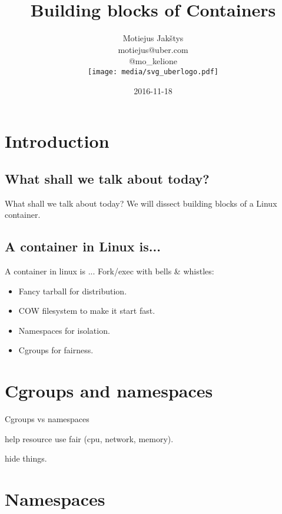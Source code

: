 \documentclass[14pt]{beamer}
\title{Building blocks of Containers}
\author{Motiejus Jak\v{s}tys \\
    motiejus@uber.com \\
    @mo\_kelione \\
    \vspace{1em}
    \texttt{[image: media/svg\_uberlogo.pdf]}
}
\date{2016-11-18}
\begin{document}

\begin{frame}
\titlepage
\end{frame}

\section{Introduction}
\subsection{What shall we talk about today?}
\begin{frame}{What shall we talk about today?}
    We will dissect building blocks of a Linux container.
\end{frame}

\subsection{A container in Linux is...}
\begin{frame}{A container in linux is ...}
    Fork/exec with bells \& whistles:
    \begin{itemize}[<+(1)->]
        \item Fancy tarball for distribution.
        \item COW filesystem to make it start fast.
        \item Namespaces for isolation.
        \item Cgroups for fairness.
    \end{itemize}
\end{frame}

\section{Cgroups and namespaces}
\begin{frame}{Cgroups vs namespaces}
    \begin{description}[<+(1)->]
        \item[cgroups] help resource use fair (cpu, network, memory).
        \item[namespaces] hide things.
    \end{description}
\end{frame}

\section{Namespaces}
\end{document}
